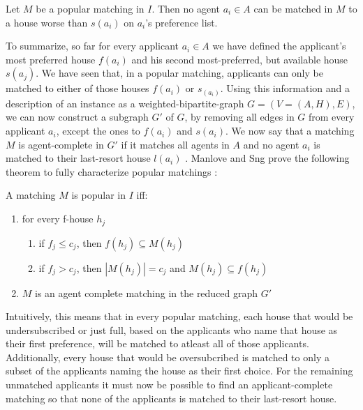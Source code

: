 \newtheorem{lemma-popular-3}[theorem]{Lemma}
\begin{lemma}\label{lemma-popular3}
    Let $M$ be a popular matching in $I$. Then no agent $a_i \in A$ can be matched in $M$ to a house worse than $s(a_i)$ on $a_i$'s preference list.
\end{lemma} 

To summarize, so far for every applicant $a_i \in A$ we have defined the applicant's most preferred house $f(a_i)$ and his second most-preferred, but available house $s(a_j)$. We have seen that, in a popular matching, applicants can only be matched to either of those houses $f(a_i)$ or $s_(a_i)$. Using this information and a description of an instance as a weighted-bipartite-graph $G = (V=(A, H), E)$, we can now construct a subgraph $G'$ of $G$, by removing all edges in $G$ from every applicant $a_i$, except the ones to $f(a_i)$ and $s(a_i)$. We now say that a matching $M$ is agent-complete in $G'$ if it matches all agents in $A$ and no agent $a_i$ is matched to their last-resort house $l(a_i)$ \cite{ManlovePopularMatchings}. Manlove and Sng prove the following theorem to fully characterize popular matchings \cite{ManlovePopularMatchings}:
\newtheorem{theorem-popular-4}[theorem]{Theorem}
\begin{theorem}\label{theorem-popular-4}
    A matching $M$ is popular in $I$ iff:
    \begin{enumerate}
        \item for every f-house $h_j$
        \begin{enumerate}
            \item\label{condition1a} if $f_j \leq c_j$, then $f(h_j) \subseteq M(h_j)$
            \item\label{condition1b} if $f_j > c_j$, then $|M(h_j)| = c_j$ and $M(h_j) \subseteq f(h_j)$
        \end{enumerate}
        \item $M$ is an agent complete matching in the reduced graph $G'$
    \end{enumerate}
\end{theorem} 

Intuitively, this means that in every popular matching, each house that would be undersubscribed or just full, based on the applicants who name that house as their first preference, will be matched to atleast all of those applicants. Additionally, every house that would be oversubcribed is matched to only a subset of the applicants naming the house as their first choice. For the remaining unmatched applicants it must now be possible to find an applicant-complete matching so that none of the applicants is matched to their last-resort house.

